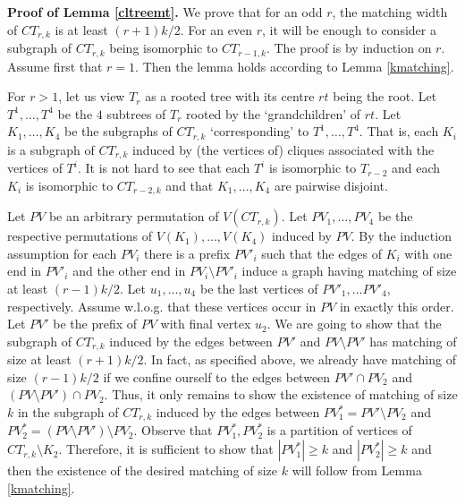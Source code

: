 \documentclass{article}
\begin{document}
{\bf Proof of Lemma \ref{cltreemt}.}
We prove that for an odd $r$, the matching width of $CT_{r,k}$ is at least
$(r+1)k/2$. For an even $r$, it will be enough to consider a subgraph of
$CT_{r,k}$ being isomorphic to $CT_{r-1,k}$.
The proof is by induction on $r$.
Assume first that $r=1$. Then the lemma holds according to
Lemma \ref{kmatching}.

For $r>1$, let us view $T_r$ as a rooted tree with its centre $rt$ being the 
root. Let $T^1, \dots, T^4$ be the $4$ subtrees of $T_r$ rooted by the `grandchildren'
of $rt$. Let $K_1, \dots, K_4$ be the subgraphs of $CT_{r,k}$ `corresponding' to
$T^1, \dots, T^4$. That is, each $K_i$ is a subgraph of $CT_{r,k}$ 
induced by (the vertices of) cliques associated with the vertices
of $T^i$. It is not hard to see that each $T^i$ is isomorphic to $T_{r-2}$ and each
$K_i$ is isomorphic to $CT_{r-2,k}$ and that $K_1, \dots, K_4$ are pairwise disjoint. 

\begin{comment}
Let us call $CT_{r,k}$ the $k$-\emph{clique-tree} of $T_r$.
Let $K_1, \dots, K_4$, be the subgraphs of $CT_{r,k}$ that are 
$k$ clique-trees of the subtrees of $T_r$ rooted by the grandchildren 
of $rt$.
\end{comment}

\begin{comment}
In order to continue, we need the notion of \emph{induced permutation}. 
In particular, let $P_1$ be a permutation of elements of a set $S_1$
and let $S_2 \subset S_1$. Then $P_1$ induces a permutation $P_2$ of $S_2$
where the elements of $S_2$ are ordered exactly as they are ordered in $P_1$.
\end{comment}

Let $PV$ be an arbitrary permutation of $V(CT_{r,k})$.
Let $PV_1, \dots, PV_4$ be the respective permutations of $V(K_1), \dots, V(K_4)$
induced by $PV$. By the induction assumption for each $PV_i$ there is a prefix
$PV'_i$ such that the edges of $K_i$ with one end in $PV'_i$ and the other end in
$PV_i \setminus PV'_i$ induce a graph having matching of size at least $(r-1)k/2$.
Let $u_1, \dots, u_4$ be the last vertices of $PV'_1, \dots PV'_4$, respectively.
Assume w.l.o.g. that these vertices occur in $PV$ in exactly this order.
Let $PV'$ be the prefix of $PV$ with final vertex $u_2$. We are going to show that
the subgraph of $CT_{r,k}$ induced by the edges between $PV'$ and $PV \setminus PV'$
has matching of size at least $(r+1)k/2$. In fact, as specified above, we already have 
matching of size $(r-1)k/2$ if we confine ourself to the edges between $PV' \cap PV_2$
and $(PV \setminus PV') \cap PV_2$. Thus, it only remains to show the existence of matching
of size $k$ in the subgraph of $CT_{r,k}$ induced by the edges between
$PV^*_1=PV' \setminus PV_2$ and $PV^*_2=(PV \setminus PV') \setminus PV_2$. 
Observe that $PV^*_1,PV^*_2$ is a partition of vertices of $CT_{r,k} \setminus K_2$.
Therefore, it is sufficient to show that $|PV^*_1| \geq k$ and $|PV^*_2| \geq k$ and then
the existence of the desired matching of size $k$ will follow from Lemma \ref{kmatching}.
\end{document}

